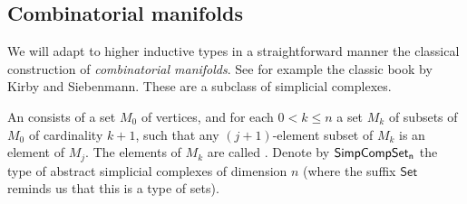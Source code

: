 \subsection{Combinatorial manifolds}

We will adapt to higher inductive types in a straightforward manner the classical construction of \emph{combinatorial manifolds}. See for example the classic book by Kirby and Siebenmann\cite{kirby_siebenmann}. These are a subclass of simplicial complexes.

\begin{mydef}
An  consists of a set \( M_0 \) of vertices, and for each \( 0<k\leq n \) a set \( M_k \) of subsets of \( M_0 \) of cardinality \( k+1 \), such that any \( (j+1) \)-element subset of \( M_k \) is an element of \( M_j \). The elements of \( M_k \) are called . Denote by \( \mathsf{SimpCompSet_n} \) the type of abstract simplicial complexes of dimension \( n \) (where the suffix \( \mathsf{Set} \) reminds us that this is a type of sets).
\end{mydef}

